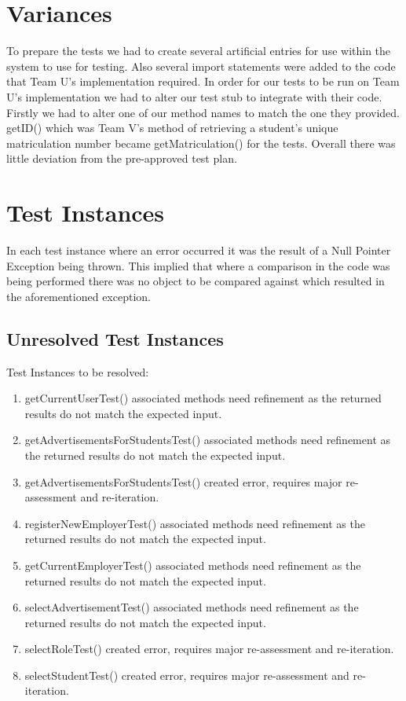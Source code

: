 \documentclass{l3deliverable}
\begin{document}
\section{Variances}
To prepare the tests we had to create several artificial entries for use within the system to use for testing. Also several import statements were added to the code that Team U's implementation required.
In order for our tests to be run on Team U's implementation we had to alter our test stub to integrate with their code. Firstly we had to alter one of our method names to match the one they provided. getID() which was Team V's method of retrieving a student's unique matriculation number became getMatriculation() for the tests.  
Overall there was little deviation from the pre-approved test plan.

\section{Test Instances}
In each test instance where an error occurred it was the result of a Null Pointer Exception being thrown. This implied that where a comparison in the code was being performed there was no object to be compared against which resulted in the aforementioned exception. 

\subsection{Unresolved Test Instances}

Test Instances to be resolved:\\

\begin{enumerate} 
\item getCurrentUserTest() associated methods need refinement as the returned results do not match the expected input.
\item getAdvertisementsForStudentsTest() associated methods need refinement as the returned results do not match the expected input.
\item getAdvertisementsForStudentsTest() created error, requires major re-assessment and re-iteration.
\item registerNewEmployerTest() associated methods need refinement as the returned results do not match the expected input.
\item getCurrentEmployerTest() associated methods need refinement as the returned results do not match the expected input.
\item selectAdvertisementTest() associated methods need refinement as the returned results do not match the expected input.
\item selectRoleTest() created error, requires major re-assessment and re-iteration.
\item selectStudentTest() created error, requires major re-assessment and re-iteration.
\end{enumerate}
\end{document}
